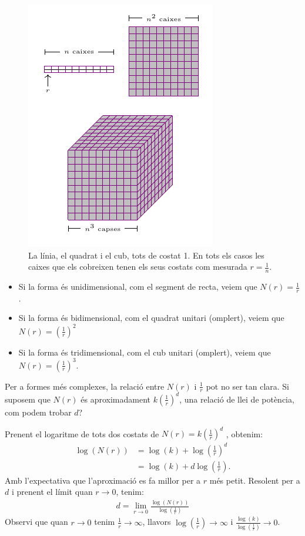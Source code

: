 \documentclass[12pt,a4paper]{report}
\begin{document}
\begin{figure}[!ht]
\centering
\includegraphics[scale=1.5]{img/img02_dim_box.pdf}
\caption{La línia, el quadrat i el  cub, tots de costat 1. En tots els casos les  caixes que els cobreixen tenen els seus costats com mesurada $\displaystyle r=\frac{1}{n}$.}
\label{img02_01_box}
\end{figure}

\begin{itemize}
\item Si la forma és unidimensional, com el segment de recta, veiem que $N(r) = \displaystyle\frac{1}{r}$.
\item Si la forma és bidimensional, com el quadrat unitari (omplert), veiem que $N(r) = \displaystyle\left(\frac{1}{r}\right)^2$
\item Si la forma és tridimensional, com el cub unitari (omplert), veiem que $N(r) = \displaystyle\left(\frac{1}{r}\right)^3$.
\end{itemize}
Per a formes més complexes, la relació entre $N(r)$ i $\displaystyle\frac{1}{r}$ pot no ser tan clara. Si suposem que $N(r)$ és aproximadament $k\displaystyle\left(\frac{1}{r}\right)^d$, una relació de llei de potència, com podem trobar $d$?

Prenent el logaritme de tots dos costats de $N(r) = k\displaystyle\left(\frac{1}{r}\right)^d$ , obtenim:
\begin{align*}
 \log(N(r))  &= \log(k) + \log\left(\frac{1}{r}\right)^d \\
             &= \log(k) + d\log\left(\frac{1}{r}\right).  
\end{align*}
Amb l'expectativa que l'aproximació es fa millor per a $r$ més petit. Resolent per a $d$ i prenent el límit quan $r \rightarrow 0$, tenim:
\begin{align*}
 d = \lim_{r\rightarrow 0}\frac{\log(N(r))}{\log(\frac{1}{r})} 
\end{align*}
Observi que quan $r\rightarrow 0$ tenim $\displaystyle\frac{1}{r}\rightarrow \infty$, llavors $\displaystyle\log\left(\frac{1}{r}\right)\rightarrow \infty$ i $\displaystyle\frac{\log(k)}{\log(\frac{1}{r})} \rightarrow 0$.
\end{document}
